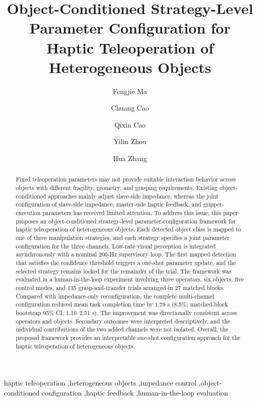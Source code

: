 \documentclass[5p,times]{elsarticle}
\begin{document}
\begin{frontmatter}
\title{Object-Conditioned Strategy-Level Parameter Configuration for Haptic Teleoperation of Heterogeneous Objects}

\author[a]{Fengjie Ma}
\author[b]{Chuang Cao}
\author[b]{Qixin Cao}
\author[a]{Yilin Zhou}
\author[a]{Hua Zhang}


\begin{abstract}
Fixed teleoperation parameters may not provide suitable interaction behavior across objects with different fragility, geometry, and grasping requirements. Existing object-conditioned approaches mainly adjust slave-side impedance, whereas the joint configuration of slave-side impedance, master-side haptic feedback, and gripper-execution parameters has received limited attention. To address this issue, this paper proposes an object-conditioned strategy-level parameter-configuration framework for haptic teleoperation of heterogeneous objects. Each detected object class is mapped to one of three manipulation strategies, and each strategy specifies a joint parameter configuration for the three channels. Low-rate visual perception is integrated asynchronously with a nominal 200-Hz supervisory loop. The first mapped detection that satisfies the confidence threshold triggers a one-shot parameter update, and the selected strategy remains locked for the remainder of the trial. The framework was evaluated in a human-in-the-loop experiment involving three operators, six objects, five control modes, and 135 grasp-and-transfer trials arranged in 27 matched blocks. Compared with impedance-only reconfiguration, the complete multi-channel configuration reduced mean task completion time by 1.79 s (8.5\%; matched-block bootstrap 95\% CI, 1.10--2.51 s). The improvement was directionally consistent across operators and objects. Secondary outcomes were interpreted descriptively, and the individual contributions of the two added channels were not isolated. Overall, the proposed framework provides an interpretable one-shot configuration approach for the haptic teleoperation of heterogeneous objects.
\end{abstract}

\begin{keyword}
haptic teleoperation \sep heterogeneous objects \sep impedance control \sep object-conditioned configuration \sep haptic feedback \sep human-in-the-loop evaluation
\end{keyword}
\end{frontmatter}












\end{document}
